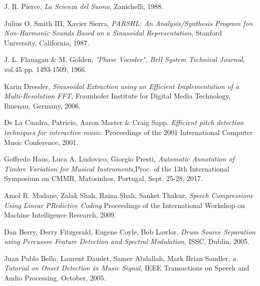 \documentclass[12pt]{report}
\begin{document}
\begin{thebibliography}{00}

J. R. Pierce, {\itshape La Scienza del Suono}, Zanichelli, 1988.

Julius O. Smith III, Xavier Sierra, {\itshape PARSHL: An Analysis/Synthesis Program fon Non-Harmonic Sounds Based on a Sinusoidal Representation}, Stanford University, California, 1987.

J. L. Flanagan \& M. Golden, {\itshape "Phase Vocoder", Bell System Technical Journal}, vol.45 pp. 1493-1509, 1966.

Karin Dressler, {\itshape Sinusoidal Extraction using an Efficient Implementation of a Multi-Resolution FFT}, Fraunhofer Institute for Digital Media Technology, Ilmenau, Germany, 2006. 

De La Cuadra, Patricio, Aaron Master \& Craig Sapp. {\itshape Efficient pitch detection techniques for interactive music}. Proceedings of the 2001 International Computer Music Conference, 2001.

Goffredo Haus, Luca A. Ludovico, Giorgio Presti, {\itshape Automatic Annotation of Timbre Variation for Musical Instruments},Proc. of the 13th International Symposium on CMMR, Matosinhos, Portugal, Sept. 25-28, 2017.

Amol R. Madane, Zalak Shah, Raina Shah, Sanket Thakur, {\itshape Speech Compressione Using Linear PRedictive Coding} Proceedings of the International Workshop on Machine Intelligence Research, 2009.

Dan Berry, Derry Fitzgerald, Eugene Coyle, Bob Lawlor, {\itshape Drum Source Separation using Percussve Feature Detection and Spectral Modulation}, ISSC, Dublin, 2005.

Juan Pablo Bello, Laurent Daudet, Samer Abdallah, Mark Brian Sandler, {\itshape a Tutorial on Onset Detection in Music Signal}, IEEE Transactions on Speech and Audio Processing, October, 2005.
\end{thebibliography}
\end{document}
